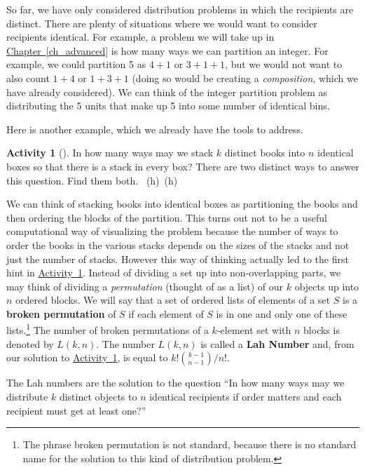 \documentclass[10pt,]{book}
\newcommand{\terminology}[1]{\textbf{#1}}
\theoremstyle{plain}
\theoremstyle{definition}
\theoremstyle{definition}
\theoremstyle{definition}
\newtheorem{activity}[project]{Activity}
\numberwithin{equation}{chapter}
\begin{document}
\hypertarget{p-870}{}%
So far, we have only considered distribution problems in which the recipients are distinct.  There are plenty of situations where we would want to consider recipients identical.  For example, a problem we will take up in \hyperref[ch_advanced]{Chapter~\ref{ch_advanced}} is how many ways we can partition an integer.  For example, we could partition 5 as \(4+1\) or \(3+1+1\), but we would not want to also count \(1+4\) or \(1+3+1\) (doing so would be creating a \emph{composition}, which we have already considered).  We can think of the integer partition problem as distributing the 5 units that make up 5 into some number of identical bins.%
\par
\hypertarget{p-871}{}%
Here is another example, which we already have the tools to address.%
\begin{activity}[]\label{brokenpermutation}
\hypertarget{p-872}{}%
In how many ways may we stack \(k\) distinct books into \(n\) identical boxes so that there is a stack in every box? There are two distinct ways to answer this question.  Find them both.%
~{\tiny (h)}~{\tiny (h)}\end{activity}
\hypertarget{p-877}{}%
We can think of stacking books into identical boxes as partitioning the books and then ordering the blocks of the partition. This turns out not to be a useful computational way of visualizing the problem because the number of ways to order the books in the various stacks depends on the sizes of the stacks and not just the number of stacks. However this way of thinking actually led to the first hint in \hyperref[brokenpermutation]{Activity~\ref{brokenpermutation}}. Instead of dividing a set up into non-overlapping parts, we may think of dividing a \emph{permutation} (thought of as a list) of our \(k\) objects up into \(n\) ordered blocks. We will say that a set of ordered lists of elements of a set \(S\) is a \terminology{broken permutation}   of \(S\) if each element of \(S\) is in one and only one of these lists.\footnote{The phrase broken permutation is not standard, because there is no standard name for the solution to this kind  of distribution problem.\label{fn-11}} The number of broken permutations of a \(k\)-element set with \(n\) blocks is denoted by \(L(k,n)\). The number \(L(k,n)\) is called a \terminology{Lah Number} and, from our solution to \hyperref[brokenpermutation]{Activity~\ref{brokenpermutation}}, is equal to \(k!\binom{k-1}{n-1}/n!\).%
\par
\hypertarget{p-878}{}%
The Lah numbers are the solution to the question ``In how many ways may we distribute \(k\) distinct objects to \(n\) identical recipients if order matters and each recipient must get at least one?''%
\typeout{************************************************}
\typeout{************************************************}
\end{document}
